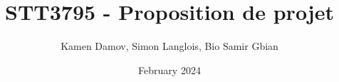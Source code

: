 \documentclass{article}
\title{STT3795 - Proposition de projet}
\author{Kamen Damov, Simon Langlois, Bio Samir Gbian}
\date{February 2024}
\begin{document}
\maketitle
\begin{comment}
\section{Descriptions et objectifs}
L'objectif de ce projet est de comparer différentes pipelines d'apprentissage automatique pour classifier des langages, des types de musique, et des chiffres prononcés. Notre projet sera une analyse empirique des différentes architecture de classification. Nous allons en développer trois pipelines qui auront des prétraitement de données différents et classificateurs différents:
\subsection{}
La première architecture serait d'utiliser une pipeline de prétraitement de données audios soit avec un Fourier Transform à partir duquel on pourra extraire les domaines fréquentiels, et domaines temporels. Suite à cela, nous appliquerons des modèles de classifications traditionnels tel que le SVM, l'arbre de décision, la forêt d'arbres de décisions, et la Naive de Bayes. Finalement, nous allons évaluer la performance des modèles. 
\subsection{}
La deuxième architecture est d'appliquer la même pipeline de prétraitement qu'au point 1.1 mais auquel on ajoutera un algorithme de d'analyse de données topologiques nommées persistent homology qui nous donnera des caractéristiques additonnelles. Nous nous sommes inspiré de ce papier-là qui présente une méthode d'analyse topologique pour but de classification \url{https://arxiv.org/abs/1910.08345}. Suite à ce prétraitement, nous allons utiliser les mêmes classificateurs qu'au point 1.1.
\subsection{}
La troisième architecture sera d'appliquer la même pipeline que le point 2.1 mais d'appliquer un modèle d'apprentissage profond soit un réseaux de neurones convolutionnel (CNN).\\\\
Nous allons utiliser ces trois pipelines sur trois jeux de données audios différents ce qui nous donnera la possibilité de comparer les types d'architectures entre elles, mais aussi de comparer un type d'architecture sur 3 jeux de données différents. 

\end{comment}
\end{document}
